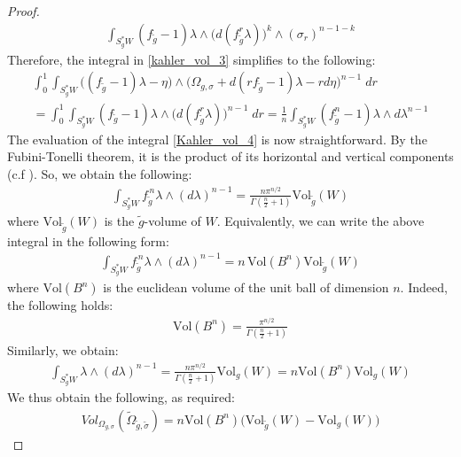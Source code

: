 \documentclass[11pt]{amsart}
\theoremstyle{plain}
\theoremstyle{definition}
\theoremstyle{remark}
\begin{document}
\begin{proof}
\begin{align}
    \int_{S^*_gW} (f_{\tilde g}-1)\lambda \wedge \big(d(f^r_{\tilde g}\lambda)\big)^k \wedge (\sigma_r)^{n-1-k}
\end{align}
Therefore, the integral in \eqref{kahler_vol_3} simplifies to the following:
\begin{align}\label{Kahler_vol_4}
\int^1_0\int_{S^*_gW} \big((f_{\tilde g}-1)\lambda - \eta\big) \wedge\bigg(\Omega_{g,\sigma} + d(rf_{\tilde g}-1)\lambda - rd\eta \bigg)^{n-1} \; dr\\\nonumber = \int^1_0\int_{S^*_gW} (f_{\tilde g}-1)\lambda \wedge \big(d(f_{\tilde g}^r\lambda) \big)^{n-1}\; dr = \frac{1}{n} \int_{S^*_gW} (f^{n}_{\tilde g}-1)\lambda \wedge d\lambda^{n-1}
\end{align}
The evaluation of the integral \eqref{Kahler_vol_4} is now straightforward. By the Fubini-Tonelli theorem, it is the product of its horizontal and vertical components (c.f \cite[Pg.3]{Abbondandolo-Benedetti}). So, we obtain the following:
\begin{align}
    \int_{S^*_gW}
f_{\tilde g}^{\,n}\lambda\wedge(d\lambda)^{n-1}
=
\frac{n\pi^{n/2}}{\Gamma\left(\frac n2+1\right)}
\text{Vol}_{\tilde g}(W)
\end{align}
where $\text{Vol}_{\tilde g}(W)$ is the $\tilde g$-volume of $W$. Equivalently, we can write the above integral in the following form:
\begin{align}
    \int_{S^*_gW}
f_{\tilde g}^{\,n}\lambda\wedge(d\lambda)^{n-1}
=
n\,\text{Vol}(B^n)\text{Vol}_{\tilde g}(W)
\end{align}
where $\text{Vol}(B^n)$ is the euclidean volume of the unit ball of dimension $n$. Indeed, the following holds:
\begin{align}
    \text{Vol}(B^n)
=
\frac{\pi^{n/2}}{\Gamma\left(\frac n2+1\right)}
\end{align}
Similarly, we obtain:
\begin{align}
     \int_{S^*_gW}
\lambda\wedge(d\lambda)^{n-1}
=
\frac{n\pi^{n/2}}{\Gamma\left(\frac n2+1\right)}
\text{Vol}_{g}(W) = n \text{Vol}(B^n)\text{Vol}_g(W)
\end{align}
We thus obtain the following, as required:
\begin{align}
Vol_{\Omega_{g,\sigma}}(\tilde \Omega_{\tilde g, \tilde \sigma}) =     n\text{Vol}(B^n) \Big( \text{Vol}_{\tilde g}(W) - \text{Vol}_{g}(W) \Big)
\end{align}
    \end{proof}
\end{document}
